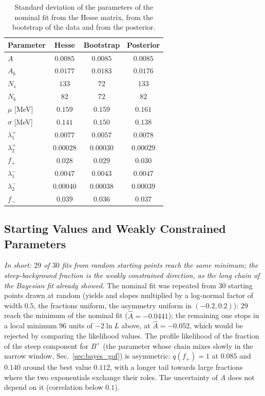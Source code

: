 \begin{table}[h]
\centering
\begin{tabular}{lccc}
\toprule
Parameter & Hesse & Bootstrap & Posterior \\
\midrule
$A$ & $0.0085$ & $0.0085$ & $0.0085$ \\
$A_b$ & $0.0177$ & $0.0183$ & $0.0176$ \\
$N_s$ & $133$ & $72$ & $133$ \\
$N_b$ & $82$ & $72$ & $82$ \\
$\mu$ [MeV] & $0.159$ & $0.159$ & $0.161$ \\
$\sigma$ [MeV] & $0.141$ & $0.150$ & $0.138$ \\
$\lambda_1^+$ & $0.0077$ & $0.0057$ & $0.0078$ \\
$\lambda_2^+$ & $0.00028$ & $0.00030$ & $0.00029$ \\
$f_+$ & $0.028$ & $0.029$ & $0.030$ \\
$\lambda_1^-$ & $0.0047$ & $0.0043$ & $0.0047$ \\
$\lambda_2^-$ & $0.00040$ & $0.00038$ & $0.00039$ \\
$f_-$ & $0.039$ & $0.036$ & $0.037$ \\
\bottomrule
\end{tabular}
\caption{Standard deviation of the parameters of the nominal fit from the Hesse matrix, from the bootstrap of the data and from the posterior.}
\label{tab:checks_covariance}
\end{table}

\subsection{Starting Values and Weakly Constrained Parameters}
\label{sec:checks_multistart}
\emph{In short: $29$ of $30$ fits from random starting points reach the same minimum; the steep-background fraction is the weakly constrained direction, as the long chain of the Bayesian fit already showed.}
The nominal fit was repeated from $30$ starting points drawn at random (yields and slopes multiplied by a log-normal factor of width $0.5$, the fractions uniform, the asymmetry uniform in $(-0.2,0.2)$): $29$ reach the minimum of the nominal fit ($\hat A=-0.0441$); the remaining one stops in a local minimum $96$ units of $-2\ln L$ above, at $\hat A=-0.052$, which would be rejected by comparing the likelihood values. The profile likelihood of the fraction of the steep component for $B^+$ (the parameter whose chain mixes slowly in the narrow window, Sec.~\ref{sec:bayes_gof}) is asymmetric: $q(f_+)=1$ at $0.085$ and $0.140$ around the best value $0.112$, with a longer tail towards large fractions where the two exponentials exchange their roles. The uncertainty of $A$ does not depend on it (correlation below $0.1$).

